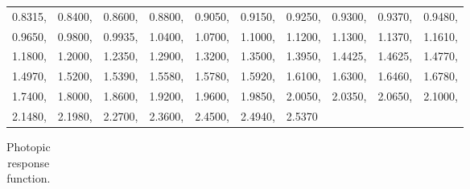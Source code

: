 \begin{longtable}[c]{p{0.5in}p{0.5in}p{0.5in}p{0.5in}p{0.5in}p{0.5in}p{0.5in}p{0.5in}p{0.5in}p{0.5in}}
0.8315, & 0.8400, & 0.8600, & 0.8800, & 0.9050, & 0.9150, & 0.9250, & 0.9300, & 0.9370, & 0.9480, \tabularnewline
0.9650, & 0.9800, & 0.9935, & 1.0400, & 1.0700, & 1.1000, & 1.1200, & 1.1300, & 1.1370, & 1.1610, \tabularnewline
1.1800, & 1.2000, & 1.2350, & 1.2900, & 1.3200, & 1.3500, & 1.3950, & 1.4425, & 1.4625, & 1.4770, \tabularnewline
1.4970, & 1.5200, & 1.5390, & 1.5580, & 1.5780, & 1.5920, & 1.6100, & 1.6300, & 1.6460, & 1.6780, \tabularnewline
1.7400, & 1.8000, & 1.8600, & 1.9200, & 1.9600, & 1.9850, & 2.0050, & 2.0350, & 2.0650, & 2.1000, \tabularnewline
2.1480, & 2.1980, & 2.2700, & 2.3600, & 2.4500, & 2.4940, & 2.5370 \tabularnewline
\bottomrule
\end{longtable}

\begin{longtable}[c]{p{0.5in}p{0.5in}p{0.5in}p{0.5in}p{0.5in}p{0.5in}p{0.5in}p{0.5in}p{0.5in}p{0.5in}}

\caption{Photopic response function. \label{table:photopic-response-function.}} \tabularnewline
\toprule 
\endfirsthead

\caption[]{Photopic response function.} \tabularnewline
\toprule 
\endhead


\end{longtable}
